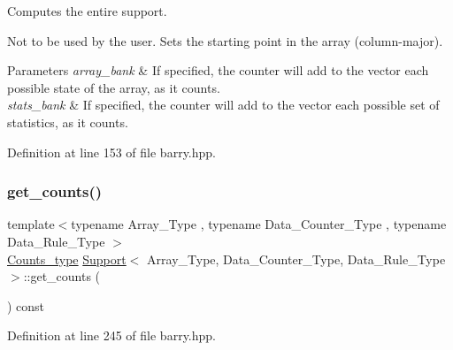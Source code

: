 Computes the entire support. 

Not to be used by the user. Sets the starting point in the array (column-\/major).


\begin{DoxyParams}{Parameters}
{\em array\+\_\+bank} & If specified, the counter will add to the vector each possible state of the array, as it counts.\\
\hline
{\em stats\+\_\+bank} & If specified, the counter will add to the vector each possible set of statistics, as it counts. \\
\hline
\end{DoxyParams}


Definition at line 153 of file barry.\+hpp.

\mbox{\label{classbarry_1_1_support_a5d93a94eaed9b1157fb934284883fd47}} 
\subsubsection{\texorpdfstring{get\+\_\+counts()}{get\_counts()}}
{\footnotesize\ttfamily template$<$typename Array\+\_\+\+Type , typename Data\+\_\+\+Counter\+\_\+\+Type , typename Data\+\_\+\+Rule\+\_\+\+Type $>$ \\
\hyperlink{namespacebarry_a3e2d8c3b6cf602107559d4237d9f1315}{Counts\+\_\+type} \hyperlink{classbarry_1_1_support}{Support}$<$ Array\+\_\+\+Type, Data\+\_\+\+Counter\+\_\+\+Type, Data\+\_\+\+Rule\+\_\+\+Type $>$\+::get\+\_\+counts (\begin{DoxyParamCaption}{ }\end{DoxyParamCaption}) const\hspace{0.3cm}{\ttfamily [inline]}}



Definition at line 245 of file barry.\+hpp.

\mbox{\label{classbarry_1_1_support_abcb4dea3c5a1b140990821900432f90e}} 
